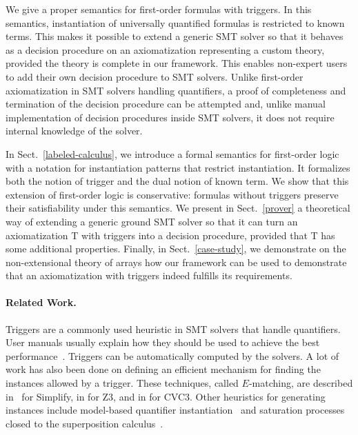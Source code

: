 \documentclass[]{easychair}
\begin{document}
We give a proper semantics for first-order formulas with
triggers. In this semantics, instantiation of universally quantified
formulas is restricted to known terms. This makes it possible to extend a
generic SMT solver so that it behaves as a decision procedure on an
axiomatization representing a custom theory, provided the theory is complete in
our framework. This enables non-expert users to add their own decision
procedure to SMT solvers. Unlike first-order axiomatization in SMT solvers
handling quantifiers, a proof of completeness and termination of the decision
procedure can be attempted and, unlike manual implementation of decision
procedures inside SMT solvers, it does not require internal knowledge of the
solver.

  In Sect.~\ref{labeled-calculus}, we introduce a formal semantics for
  first-order logic with a notation for instantiation patterns that
  restrict instantiation. It formalizes both the notion of
  trigger and the dual notion of known term. We show that this extension
  of first-order logic is conservative: formulas without triggers
  preserve their satisfiability under this semantics. We present in
  Sect.~\ref{prover} a theoretical way of extending a
  generic ground SMT solver so that it can turn an axiomatization T with
triggers into a decision procedure, provided that T has
some additional properties.
  Finally, in Sect.~\ref{case-study}, we
  demonstrate on the non-extensional theory of arrays how our framework can be
  used to demonstrate that an axiomatization with triggers indeed fulfills its
  requirements.

\paragraph{Related Work.}

Triggers are a commonly used heuristic in SMT solvers that handle
quantifiers. User manuals usually
explain how they should be used to achieve the best
performance~\cite{Simplify,moskal-2009,CVC3}. Triggers can be automatically
computed by the solvers. A lot of work has also been
done on defining an efficient mechanism for finding the instances
allowed by a trigger. These techniques, called $E$-matching, are
described in~\cite{Simplify,nelson-arrays} for Simplify,
in \cite{Z3-e-matching} for Z3, and in \cite{CVC3} for CVC3.
Other heuristics for generating instances include model-based quantifier
instantiation~\cite{MBQI} and saturation processes closed to the superposition
calculus~\cite{saturation}.
%
\end{document}
